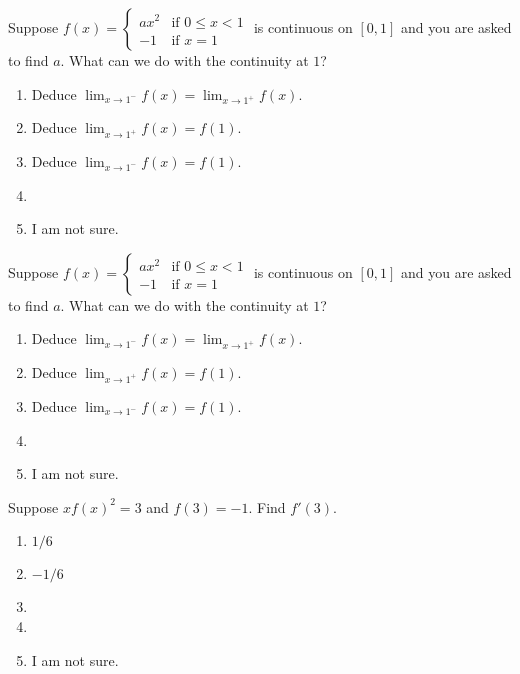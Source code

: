 \documentclass[14pt]{beamer}
\begin{document}
\begin{frame}[t]
  Suppose \(f(x) = \begin{cases} ax^{2} &\text{if } 0 \le x < 1 \\ -1 &\text{if } x = 1 \end{cases}\) is continuous on \([0,1]\) and you are asked to find \(a\). What can we do with the continuity at \(1\)?

  \medskip
  \begin{enumerate} 
    \item Deduce \(\lim_{x \to 1^{-}} f(x) = \lim_{x \to 1^{+}} f(x)\).
    \item Deduce \(\lim_{x \to 1^{+}} f(x) = f(1)\).
    \item Deduce \(\lim_{x \to 1^{-}} f(x) = f(1)\).
    \item 
    \item I am not sure.
  \end{enumerate} 
\end{frame}

\begin{frame}[t]
  Suppose \(f(x) = \begin{cases} ax^{2} &\text{if } 0 \le x < 1 \\ -1 &\text{if } x = 1 \end{cases}\) is continuous on \([0,1]\) and you are asked to find \(a\). What can we do with the continuity at \(1\)?

  \medskip
  \begin{enumerate} 
    \item Deduce \(\lim_{x \to 1^{-}} f(x) = \lim_{x \to 1^{+}} f(x)\).
    \item Deduce \(\lim_{x \to 1^{+}} f(x) = f(1)\).
    \item Deduce \(\lim_{x \to 1^{-}} f(x) = f(1)\).
    \item 
    \item I am not sure.
  \end{enumerate} 
\end{frame}

\begin{frame}[t]
  Suppose \(x f(x)^{2} = 3\) and \(f(3) = -1\). Find \(f'(3)\).

  \medskip
  \begin{enumerate} 
    \item \(1/6\)
    \item \(-1/6\)
    \item
    \item
    \item I am not sure.
  \end{enumerate}
\end{frame}
\end{document}
